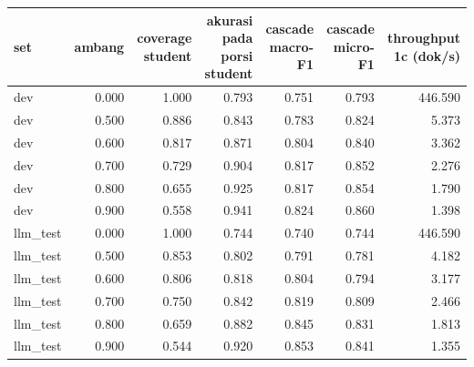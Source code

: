 \begin{tabular}{lrrrrrr}
\toprule
set & ambang & coverage student & akurasi pada porsi student & cascade macro-F1 & cascade micro-F1 & throughput 1c (dok/s) \\
\midrule
dev & 0.000 & 1.000 & 0.793 & 0.751 & 0.793 & 446.590 \\
dev & 0.500 & 0.886 & 0.843 & 0.783 & 0.824 & 5.373 \\
dev & 0.600 & 0.817 & 0.871 & 0.804 & 0.840 & 3.362 \\
dev & 0.700 & 0.729 & 0.904 & 0.817 & 0.852 & 2.276 \\
dev & 0.800 & 0.655 & 0.925 & 0.817 & 0.854 & 1.790 \\
dev & 0.900 & 0.558 & 0.941 & 0.824 & 0.860 & 1.398 \\
llm\_test & 0.000 & 1.000 & 0.744 & 0.740 & 0.744 & 446.590 \\
llm\_test & 0.500 & 0.853 & 0.802 & 0.791 & 0.781 & 4.182 \\
llm\_test & 0.600 & 0.806 & 0.818 & 0.804 & 0.794 & 3.177 \\
llm\_test & 0.700 & 0.750 & 0.842 & 0.819 & 0.809 & 2.466 \\
llm\_test & 0.800 & 0.659 & 0.882 & 0.845 & 0.831 & 1.813 \\
llm\_test & 0.900 & 0.544 & 0.920 & 0.853 & 0.841 & 1.355 \\
\bottomrule
\end{tabular}
